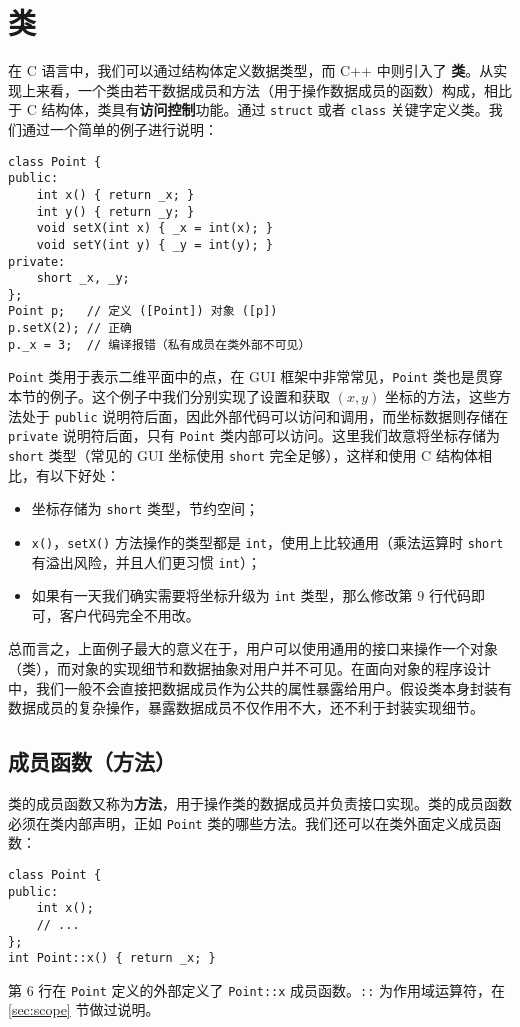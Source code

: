 \documentclass[hyperref,UTF8]{article}
\begin{document}
\section{类}

在 C 语言中，我们可以通过结构体定义数据类型，而 C++ 中则引入了 \textbf{类}。从实现上来看，一个类由若干数据成员和方法（用于操作数据成员的函数）构成，相比于 C 结构体，类具有\textbf{访问控制}功能。通过 \texttt{struct} 或者 \texttt{class} 关键字定义类。我们通过一个简单的例子进行说明：
\begin{lstlisting}
class Point {
public:
    int x() { return _x; }
    int y() { return _y; }
    void setX(int x) { _x = int(x); }
    void setY(int y) { _y = int(y); }
private:
    short _x, _y;
};
Point p;   // 定义 ([Point]) 对象 ([p])
p.setX(2); // 正确
p._x = 3;  // 编译报错（私有成员在类外部不可见）
\end{lstlisting}
\texttt{Point} 类用于表示二维平面中的点，在 GUI 框架中非常常见，\texttt{Point} 类也是贯穿本节的例子。这个例子中我们分别实现了设置和获取 $(x, y)$ 坐标的方法，这些方法处于 \texttt{public} 说明符后面，因此外部代码可以访问和调用，而坐标数据则存储在 \texttt{private} 说明符后面，只有 \texttt{Point} 类内部可以访问。这里我们故意将坐标存储为 \texttt{short} 类型（常见的 GUI 坐标使用 \texttt{short} 完全足够），这样和使用 C 结构体相比，有以下好处：
\begin{itemize}
  \item 坐标存储为 \texttt{short} 类型，节约空间；
  \item \texttt{x()}，\texttt{setX()} 方法操作的类型都是 \texttt{int}，使用上比较通用（乘法运算时 \texttt{short} 有溢出风险，并且人们更习惯 \texttt{int}）；
  \item 如果有一天我们确实需要将坐标升级为 \texttt{int} 类型，那么修改第 9 行代码即可，客户代码完全不用改。
\end{itemize}
总而言之，上面例子最大的意义在于，用户可以使用通用的接口来操作一个对象（类），而对象的实现细节和数据抽象对用户并不可见。在面向对象的程序设计中，我们一般不会直接把数据成员作为公共的属性暴露给用户。假设类本身封装有数据成员的复杂操作，暴露数据成员不仅作用不大，还不利于封装实现细节。

\subsection{成员函数（方法）}

类的成员函数又称为\textbf{方法}，用于操作类的数据成员并负责接口实现。类的成员函数必须在类内部声明，正如 \texttt{Point} 类的哪些方法。我们还可以在类外面定义成员函数：
\begin{lstlisting}
class Point {
public:
    int x();
    // ...
};
int Point::x() { return _x; }
\end{lstlisting}
第 6 行在 \texttt{Point} 定义的外部定义了 \texttt{Point::x} 成员函数。\texttt{::} 为作用域运算符，在 \ref{sec:scope} 节做过说明。
\end{document}
